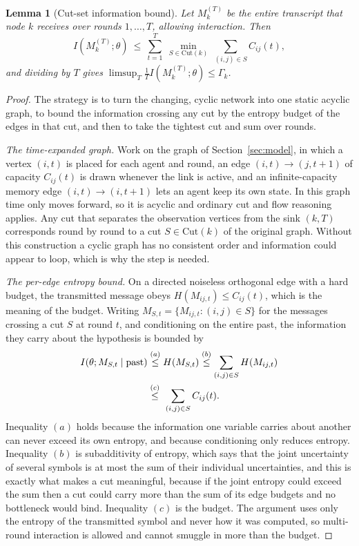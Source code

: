\documentclass[journal]{IEEEtran}
\newtheorem{lemma}{Lemma}
\theoremstyle{definition}
\theoremstyle{remark}
\newcommand{\Gk}{\Gamma_k}
\begin{document}
\begin{lemma}[Cut-set information bound]\label{lem:cutset}
Let $M_k^{(T)}$ be the entire transcript that node $k$ receives over rounds $1,\dots,T$, allowing interaction.
Then
\begin{equation}
I\!\left(M_k^{(T)};\theta\right)\ \le\ \sum_{t=1}^{T}\ \min_{S\in\mathrm{Cut}(k)}\ \sum_{(i,j)\in S} C_{ij}(t),
\end{equation}
and dividing by $T$ gives $\limsup_T \tfrac1T I(M_k^{(T)};\theta)\le\Gk$.
\end{lemma}

\begin{proof}
The strategy is to turn the changing, cyclic network into one static acyclic graph, to bound the information
crossing any cut by the entropy budget of the edges in that cut, and then to take the tightest cut and sum over
rounds.

\emph{The time-expanded graph.} Work on the graph of Section~\ref{sec:model}, in which a vertex $(i,t)$ is placed
for each agent and round, an edge $(i,t)\to(j,t+1)$ of capacity $C_{ij}(t)$ is drawn whenever the link is active,
and an infinite-capacity memory edge $(i,t)\to(i,t+1)$ lets an agent keep its own state. In this graph time only
moves forward, so it is acyclic and ordinary cut and flow reasoning applies. Any cut that separates the
observation vertices from the sink $(k,T)$ corresponds round by round to a cut $S\in\mathrm{Cut}(k)$ of the
original graph. Without this construction a cyclic graph has no consistent order and information could appear to
loop, which is why the step is needed.

\emph{The per-edge entropy bound.} On a directed noiseless orthogonal edge with a hard budget, the transmitted
message obeys $H(M_{ij,t})\le C_{ij}(t)$, which is the meaning of the budget. Writing $M_{S,t}=\{M_{ij,t}:(i,j)\in
S\}$ for the messages crossing a cut $S$ at round $t$, and conditioning on the entire past, the information they
carry about the hypothesis is bounded by
\begin{align}
I\!\left(\theta;M_{S,t}\mid \text{past}\right)
&\overset{(a)}{\le} H(M_{S,t})
\overset{(b)}{\le} \sum_{(i,j)\in S} H(M_{ij,t})\notag\\
&\overset{(c)}{\le}\ \sum_{(i,j)\in S} C_{ij}(t). \label{eq:cutchain}
\end{align}
Inequality $(a)$ holds because the information one variable carries about another can never exceed its own
entropy, and because conditioning only reduces entropy. Inequality $(b)$ is subadditivity of entropy, which says
that the joint uncertainty of several symbols is at most the sum of their individual uncertainties, and this is
exactly what makes a cut meaningful, because if the joint entropy could exceed the sum then a cut could carry more
than the sum of its edge budgets and no bottleneck would bind. Inequality $(c)$ is the budget. The argument uses
only the entropy of the transmitted symbol and never how it was computed, so multi-round interaction is allowed
and cannot smuggle in more than the budget.


\end{proof}
\end{document}
